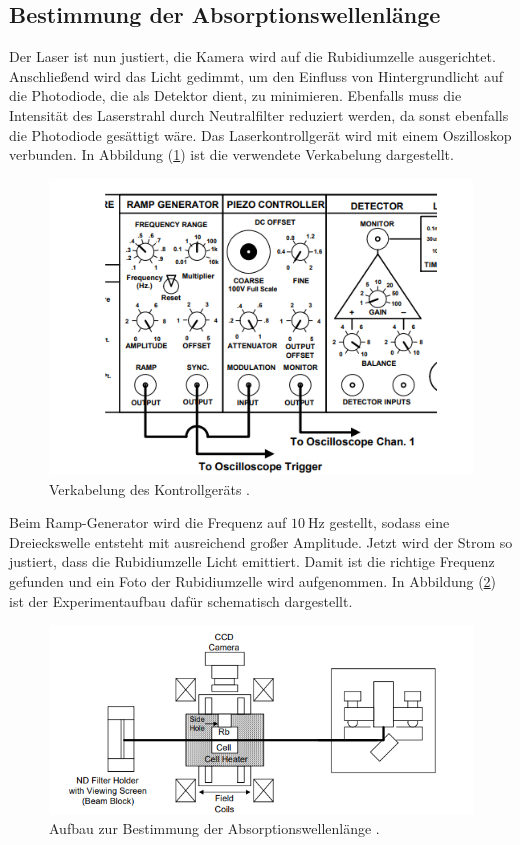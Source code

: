 \subsection{Bestimmung der Absorptionswellenlänge}
Der Laser ist nun justiert, die Kamera wird auf die Rubidiumzelle ausgerichtet. Anschließend wird das Licht gedimmt, um den Einfluss von Hintergrundlicht auf die Photodiode, die als Detektor dient, zu minimieren. Ebenfalls muss die Intensität des Laserstrahl durch Neutralfilter reduziert werden, da sonst ebenfalls die Photodiode gesättigt wäre. Das Laserkontrollgerät wird mit einem Oszilloskop verbunden.
In Abbildung (\ref{fig:auf2}) ist die verwendete Verkabelung dargestellt.
\begin{figure}[h!]
  \centering
  \includegraphics[scale=0.7]{fig/auf2.png}
  \caption{Verkabelung des Kontrollgeräts \cite[10]{Anleitung4}.}
  \label{fig:auf2}
\end{figure}
\FloatBarrier
\noindent Beim Ramp-Generator wird die Frequenz auf $\SI{10}{\hertz}$ gestellt, sodass eine Dreieckswelle entsteht mit ausreichend großer Amplitude. Jetzt wird der Strom so justiert, dass die
Rubidiumzelle Licht emittiert. Damit ist die richtige Frequenz gefunden und ein Foto der Rubidiumzelle wird aufgenommen.
In Abbildung (\ref{fig:auf3}) ist der Experimentaufbau dafür schematisch dargestellt.
\begin{figure}[h!]
  \centering
  \includegraphics[scale=0.7]{fig/auf3.png}
  \caption{Aufbau zur Bestimmung der Absorptionswellenlänge \cite[9]{Anleitung4}.}
  \label{fig:auf3}
\end{figure}
\FloatBarrier
